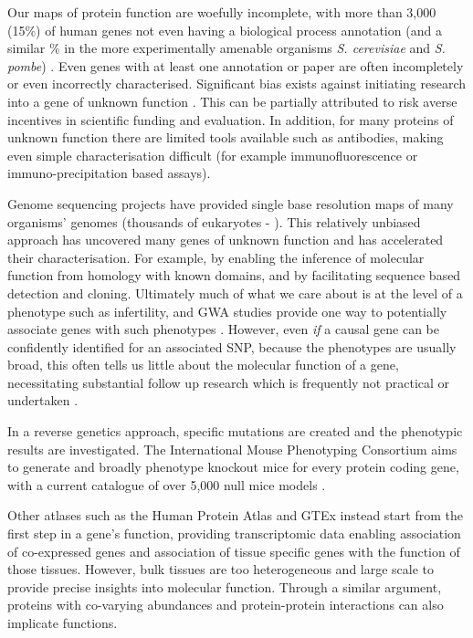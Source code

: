Our maps of protein function are woefully incomplete, with more than 3,000 (15\%) of human genes not even having a biological process annotation (and a similar \% in the more experimentally amenable organisms \textit{S. cerevisiae} and \textit{S. pombe}) \parencite{Wood2019Hidden}. Even genes with at least one annotation or paper are often incompletely or even incorrectly characterised. Significant bias exists against initiating research into a gene of unknown function \parencite{Edwards2011Too, Stoeger2018Largescale, Haynes2018Gene}. This can be partially attributed to risk averse incentives in scientific funding and evaluation. In addition, for many proteins of unknown function there are limited tools available such as antibodies, making even simple characterisation difficult (for example immunofluorescence or immuno-precipitation based assays).


Genome sequencing projects have provided single base resolution maps of many organisms' genomes (thousands of eukaryotes - \cite{Genome}). This relatively unbiased approach has uncovered many genes of unknown function and has accelerated their characterisation. For example, by enabling the inference of molecular function from homology with known domains, and by facilitating sequence based detection and cloning. Ultimately much of what we care about is at the level of a phenotype such as infertility, and GWA studies provide one way to potentially associate genes with such phenotypes \parencite{Gajbhiye2018Complex}. However, even \emph{if} a causal gene can be confidently identified for an associated SNP, because the phenotypes are usually broad, this often tells us little about the molecular function of a gene, necessitating substantial follow up research which is frequently not practical or undertaken \parencite{Visscher201710, Gallagher2018PostGWAS, Struck2018impact}.

In a reverse genetics approach, specific mutations are created and the phenotypic results are investigated. The International Mouse Phenotyping Consortium aims to generate and broadly phenotype knockout mice for every protein coding gene, with a current catalogue of over 5,000 null mice models \parencite{2004Knockout,Meehan2017Disease, Birling2019resource}.

Other atlases such as the Human Protein Atlas and GTEx instead start from the first step in a gene's function, providing transcriptomic data enabling association of co-expressed genes and association of tissue specific genes with the function of those tissues. However, bulk tissues are too heterogeneous and large scale to provide precise insights into molecular function. Through a similar argument, proteins with co-varying abundances and protein-protein interactions can also implicate functions.

